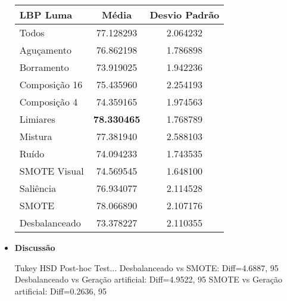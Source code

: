 \begin{itemize}
%
\begin{table}[!htbp]
\centering
\caption{}
\label{tab:resultados:x:melhor}
\begin{tabular}{|l|c|c|}
\hline
\textbf{LBP Luma} & \textbf{Média}     & \textbf{Desvio Padrão} \\ \hline
   Todos        &  77.128293 &  2.064232  \\ \hline
  Aguçamento    &  76.862198 &  1.786898  \\ \hline
  Borramento    &  73.919025 &  1.942236  \\ \hline
  Composição 16 &  75.435960 &  2.254193  \\ \hline
  Composição 4  &  74.359165 &  1.974563  \\ \hline
  Limiares      &  \textbf{78.330465} &  1.768789  \\ \hline
  Mistura       &  77.381940 &  2.588103  \\ \hline
  Ruído         &  74.094233 &  1.743535  \\ \hline
  SMOTE Visual  &  74.569545 &  1.648100  \\ \hline
  Saliência     &  76.934077 &  2.114528  \\ \hline
 SMOTE          &  78.066890 &  2.107176  \\ \hline
Desbalanceado   &  73.378227 &  2.110355  \\ \hline
\end{tabular}
\end{table}

\item[] \textbf{Discussão}

Tukey HSD Post-hoc Test...
Desbalanceado vs SMOTE: Diff=4.6887, 95%
Desbalanceado vs Geração artificial: Diff=4.9522, 95%
SMOTE vs Geração artificial: Diff=0.2636, 95%

\end{itemize}

